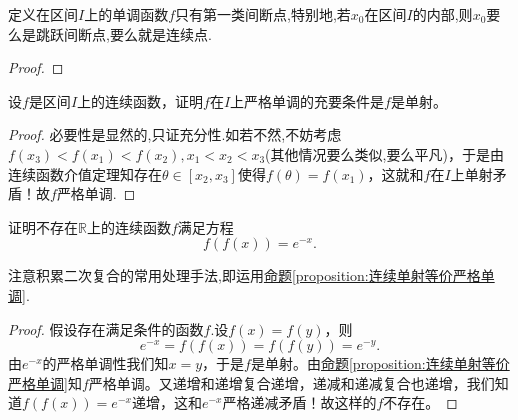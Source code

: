 \documentclass[../../main.tex]{subfiles}%
\begin{document}
\begin{proposition}\label{proposition:单调函数只有第一类间断点}
定义在区间$I$上的单调函数$f$只有第一类间断点,特别地,若$x_0$在区间$I$的内部,则$x_0$要么是跳跃间断点,要么就是连续点.
\end{proposition}
\begin{proof}



\end{proof}

\begin{proposition}[连续单射等价严格单调]\label{proposition:连续单射等价严格单调}
设\(f\)是区间\(I\)上的连续函数，证明\(f\)在\(I\)上严格单调的充要条件是\(f\)是单射。
\end{proposition}
\begin{proof}

必要性是显然的,只证充分性.如若不然,不妨考虑\(f(x_3)<f(x_1)<f(x_2),x_1<x_2<x_3\)(其他情况要么类似,要么平凡)，于是由连续函数介值定理知存在\(\theta\in[x_2,x_3]\)使得\(f(\theta)=f(x_1)\)，这就和\(f\)在\(I\)上单射矛盾！故\(f\)严格单调.

\end{proof}

\begin{example}
证明不存在\(\mathbb{R}\)上的连续函数\(f\)满足方程
\[
f(f(x)) = e^{-x}.
\]
\end{example}
\begin{note}
注意积累二次复合的常用处理手法,即运用\hyperref[proposition:连续单射等价严格单调]{命题\ref{proposition:连续单射等价严格单调}}.
\end{note}
\begin{proof}

假设存在满足条件的函数$f$.设\(f(x)=f(y)\)，则
\[
e^{-x}=f(f(x)) = f(f(y)) = e^{-y}.
\]
由\(e^{-x}\)的严格单调性我们知\(x = y\)，于是\(f\)是单射。由\hyperref[proposition:连续单射等价严格单调]{命题\ref{proposition:连续单射等价严格单调}}知\(f\)严格单调。又递增和递增复合递增，递减和递减复合也递增，我们知道\(f(f(x)) = e^{-x}\)递增，这和\(e^{-x}\)严格递减矛盾！故这样的\(f\)不存在。

\end{proof}
\end{document}
